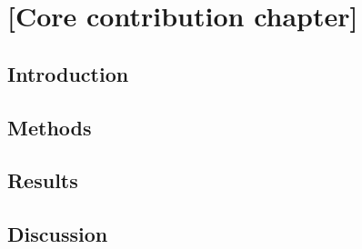 \chapter{[Core contribution chapter]}
\label{chap:contribution-3}

\section{Introduction}

\section{Methods}

\section{Results}

\section{Discussion}
